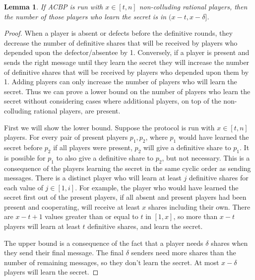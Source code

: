 \documentclass[12pt]{article}
\newtheorem{lemma}{Lemma}
\begin{document}
\begin{lemma}\label{Lem:ACBP:SomeDeltaLose}If ACBP is run with $x \in [t,n]$ non-colluding rational players, then the number of those players who learn the secret is in $(x-t, x-\delta]$.\end{lemma}
\begin{proof}
When a player is absent or defects before the definitive rounds, they decrease the number of definitive shares that will be received by players who depended upon the defector/absentee by 1. Conversely, if a player is present and sends the right message until they learn the secret they will increase the number of definitive shares that will be received by players who depended upon them by 1. Adding players can only increase the number of players who will learn the secret. Thus we can prove a lower bound on the number of players who learn the secret without considering cases where additional players, on top of the non-colluding rational players, are present.

First we will show the lower bound. Suppose the protocol is run with $x \in [t,n]$ players. For every pair of present players $p_1, p_2$, where $p_1$ would have learned the secret before $p_2$ if all players were present, $p_2$ will give a definitive share to $p_1$. It is possible for $p_1$ to also give a definitive share to $p_2$, but not necessary. This is a consequence of the players learning the secret in the same cyclic order as sending messages. There is a distinct player who will learn at least $j$ definitive shares for each value of $j \in [1, i]$. For example, the player who would have learned the secret first out of the present players, if all absent and present players had been present and cooperating, will receive at least $x$ shares including their own. There are $x-t+1$ values greater than or equal to $t$ in $[1,x]$, so more than $x-t$ players will learn at least $t$ definitive shares, and learn the secret.

The upper bound is a consequence of the fact that a player needs $\delta$ shares when they send their final message. The final $\delta$ senders need more shares than the number of remaining messages, so they don't learn the secret. At most $x-\delta$ players will learn the secret.  
\end{proof}
\end{document}
